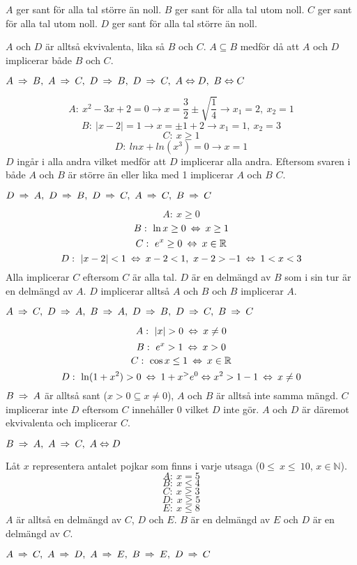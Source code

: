 \begin{task}{1.6}
	$A$ ger sant för alla tal större än noll. $B$ ger sant för alla tal utom noll. $C$ ger sant för alla tal utom noll. $D$ ger sant för alla tal större än noll. 
	
	$A$ och $D$ är alltså ekvivalenta, lika så $B$ och $C$. $A\subseteq B$ medför då att $A$ och $D$ implicerar både $B$ och $C$.
	
	\ans $A \ra B,~ A \ra C,~ D \ra B,~ D \ra C,~ A \Leftrightarrow D,~ B \Leftrightarrow C$
\end{task}

\begin{task}{1.7}
	\[A:~x^2-3x+2=0 \rightarrow x = \frac{3}{2} \pm \sqrt{\frac{1}{4}} \rightarrow x_1 = 2,~x_2 = 1\]
	\[B:~|x-2|=1 \rightarrow x=\pm 1+2 \rightarrow x_1=1,~x_2=3\]
	\[C:~x \ge 1\]
	\[D:~lnx + ln(x^3) = 0 \rightarrow x=1\]
	$D$ ingår i alla andra vilket medför att $D$ implicerar alla andra. Eftersom svaren i både $A$ och $B$ är större än eller lika med 1 implicerar $A$ och $B$ $C$.
	
	\ans $D \ra A,~ D \ra B,~ D \ra C,~ A \ra C,~ B \ra C$
\end{task}

\begin{task}{1.8}
	\[A:~x\ge 0\]
	\[B:~\ln x \ge 0 \lra x\ge 1\]
	\[C:~e^x \ge 0 \lra x \in \mathbb{R}\]
	\[D:~|x-2|<1 \lra x-2<1,~x-2>-1 \lra 1<x<3\]
	Alla implicerar $C$ eftersom $C$ är alla tal. $D$ är en delmängd av $B$ som i sin tur är en delmängd av $A$. $D$ implicerar alltså $A$ och $B$ och $B$ implicerar $A$.
	
	\ans $A \ra C,~ D \ra A,~ B \ra A,~ D \ra B,~ D \ra C,~ B \ra C$
\end{task}

\begin{task}{1.9}
	\[A:~|x|>0 \lra x\neq 0\]
	\[B:~e^x > 1 \lra x > 0\]
	\[C:~\cos x \le 1 \lra x \in \mathbb{R}\]
	\[D:~\ln(1+x^2)>0 \lra 1+x^>e^0 \Leftrightarrow x^2>1-1 \lra x\neq 0\]
	$B\ra A$ är alltså sant ($x > 0\subseteq x\neq 0$), $A$ och $B$ är alltså inte samma mängd. $C$ implicerar inte $D$ eftersom $C$ innehåller 0 vilket $D$ inte gör. $A$ och $D$ är däremot ekvivalenta och implicerar $C$.
	
	\ans $B \ra A,~ A \ra C,~ A \Leftrightarrow D$
\end{task}

\begin{task}{1.10}
	Låt $x$ representera antalet pojkar som finns i varje utsaga ($0\le~x\le~10$, $x \in \mathbb{N}$).
	\[A:~x=5\]
	\[B:~x\le 4\]
	\[C:~x\ge 3\]
	\[D:~x\ge 5\]
	\[E:~x\le 8\]
	$A$ är alltså en delmängd av $C$, $D$ och $E$. $B$ är en delmängd av $E$ och $D$ är en delmängd av $C$.
	
	\ans $A \ra C,~ A \ra D,~ A \ra E,~ B \ra E,~ D \ra C$
\end{task}

